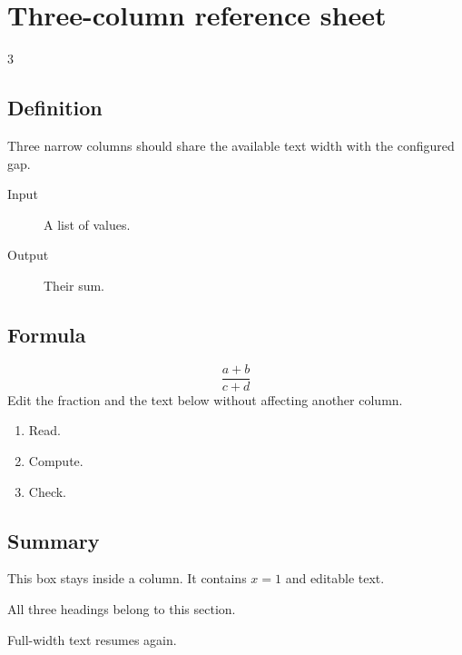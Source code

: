\documentclass[11pt,a4paper]{article}
\begin{document}
\section{Three-column reference sheet}
\begin{multicols}{3}
\subsection{Definition}
Three narrow columns should share the available text width with the configured gap.
\begin{description}\item[Input] A list of values.\item[Output] Their sum.\end{description}
\par\columnbreak
\subsection{Formula}
\[\frac{a+b}{c+d}\]
Edit the fraction and the text below without affecting another column.
\begin{enumerate}\item Read.\item Compute.\item Check.\end{enumerate}
\par\columnbreak
\subsection{Summary}
\begin{tcolorbox}[title=Key point,colback=blue!5,colframe=blue!50!black]
This box stays inside a column. It contains \(x=1\) and editable text.
\end{tcolorbox}
All three headings belong to this section.
\end{multicols}
Full-width text resumes again.
\clearpage
\end{document}
